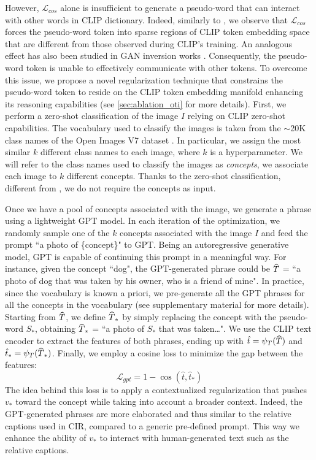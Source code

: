 \documentclass[10pt,twocolumn,letterpaper]{article}
\newcommand\wh[1]{\hstretch{2}{\hat{\hstretch{.5}{#1\mkern1mu}}}\mkern-1mu}
\begin{document}
However, $\mathcal{L}_{cos}$ alone is insufficient to generate a pseudo-word that can interact with other words in CLIP dictionary. Indeed, similarly to \cite{cohen2022this}, we observe that $\mathcal{L}_{cos}$ forces the pseudo-word token into sparse regions of CLIP token embedding space that are different from those observed during CLIP's training. An analogous effect has also been studied in GAN inversion works \cite{tov2021designing, zhu2020domain}. Consequently, the pseudo-word token is unable to effectively communicate with other tokens. To overcome this issue, we propose a novel regularization technique that constrains the pseudo-word token to reside on the CLIP token embedding manifold enhancing its reasoning capabilities (see \cref{sec:ablation_oti} for more details). First, we perform a zero-shot classification of the image $I$ relying on CLIP zero-shot capabilities. The vocabulary used to classify the images is taken from the $\sim$20K class names of the Open Images V7 dataset \cite{kuznetsova2020open}. In particular, we assign the most similar $k$ different class names to each image, where $k$ is a hyperparameter. We will refer to the class names used to classify the images as \textit{concepts}, \ie we associate each image to $k$ different concepts. Thanks to the zero-shot classification, different from \cite{cohen2022this}, we do not require the concepts as input.

Once we have a pool of concepts associated with the image, we generate a phrase using a lightweight GPT \cite{brown2020language} model. In each iteration of the optimization, we randomly sample one of the $k$ concepts associated with the image $I$ and feed the prompt ``a photo of \{concept\}" to GPT. Being an autoregressive generative model, GPT is capable of continuing this prompt in a meaningful way. For instance, given the concept ``dog", the GPT-generated phrase could be $\wh{T}$ = ``a photo of dog that was taken by his owner, who is a friend of mine". In practice, since the vocabulary is known a priori, we pre-generate all the GPT phrases for all the concepts in the vocabulary (see supplementary material for more details).
Starting from $\wh{T}$, we define $\wh{T}_*$ by simply replacing the concept with the pseudo-word $S_*$, obtaining $\wh{T}_*$ = ``a photo of $S_*$ that was taken\ldots".
We use the CLIP text encoder to extract the features of both phrases, ending up with  $\hat{t} = \psi_T(\wh{T})$ and $\hat{t}_* = \psi_T(\wh{T}_*)$.
Finally, we employ a cosine loss to minimize the gap between the features:
\begin{equation}
    \mathcal{L}_{gpt} = 1 -\cos{(\hat{t}, \hat{t}_*)}
\end{equation}
The idea behind this loss is to apply a contextualized regularization that pushes $v_*$ toward the concept while taking into account a broader context. Indeed, the GPT-generated phrases are more elaborated and thus similar to the relative captions used in CIR, compared to a generic pre-defined prompt. This way we enhance the ability of $v_*$ to interact with human-generated text such as the relative captions.
\end{document}
